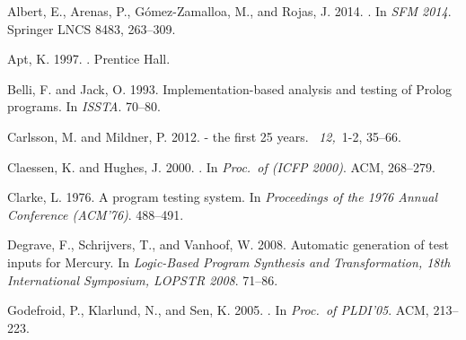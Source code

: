 \documentclass[fleqn]{tlp}
\begin{document}
\begin{thebibliography}{}

{\sc Albert, E.}, {\sc Arenas, P.}, {\sc G{\'{o}}mez{-}Zamalloa, M.}, {\sc and}
  {\sc Rojas, J.} 2014.
.
\newblock In {\em {SFM} 2014}. Springer LNCS 8483, 263--309.

{\sc Apt, K.} 1997.
.
\newblock Prentice Hall.

{\sc Belli, F.} {\sc and} {\sc Jack, O.} 1993.
\newblock Implementation-based analysis and testing of {P}rolog programs.
\newblock In {\em {ISSTA}}. 70--80.

{\sc Carlsson, M.} {\sc and} {\sc Mildner, P.} 2012.
 - the first 25 years.
~{\em 12,\/}~1-2,
  35--66.

{\sc Claessen, K.} {\sc and} {\sc Hughes, J.} 2000.
.
\newblock In {\em Proc.\ of {(ICFP} 2000)}. {ACM}, 268--279.

{\sc Clarke, L.} 1976.
\newblock A program testing system.
\newblock In {\em Proceedings of the 1976 Annual Conference (ACM'76)}.
  488--491.

{\sc Degrave, F.}, {\sc Schrijvers, T.}, {\sc and} {\sc Vanhoof, W.} 2008.
\newblock Automatic generation of test inputs for {M}ercury.
\newblock In {\em Logic-Based Program Synthesis and Transformation, 18th
  International Symposium, {LOPSTR} 2008}. 71--86.

{\sc Godefroid, P.}, {\sc Klarlund, N.}, {\sc and} {\sc Sen, K.} 2005.
.
\newblock In {\em Proc.\ of PLDI'05}. ACM, 213--223.


\end{thebibliography}
\end{document}
